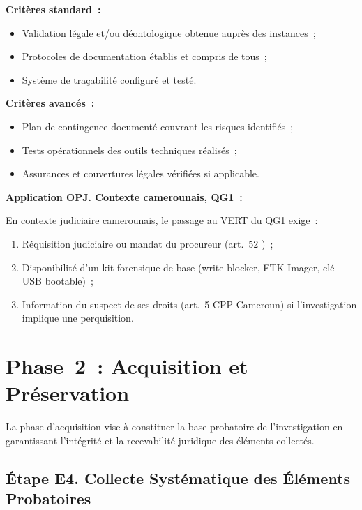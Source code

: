 \textbf{Critères standard~:}
\begin{itemize}
    \item Validation légale et/ou déontologique obtenue auprès des instances~;
    \item Protocoles de documentation établis et compris de tous~;
    \item Système de traçabilité configuré et testé.
\end{itemize}

\textbf{Critères avancés~:}
\begin{itemize}
    \item Plan de contingence documenté couvrant les risques identifiés~;
    \item Tests opérationnels des outils techniques réalisés~;
    \item Assurances et couvertures légales vérifiées si applicable.
\end{itemize}

\begin{boxPNC}
\textbf{Application OPJ. Contexte camerounais, QG1~:}

En contexte judiciaire camerounais, le passage au VERT du QG1 exige~:
\begin{enumerate}
    \item Réquisition judiciaire ou mandat du procureur (art.~52 )~;
    \item Disponibilité d'un kit forensique de base (write blocker,
          FTK Imager, clé USB bootable)~;
    \item Information du suspect de ses droits (art.~5 CPP Cameroun)
          si l'investigation implique une perquisition.
\end{enumerate}
\end{boxPNC}

\section{Phase~2~: Acquisition et Préservation}
\label{sec:piu-phase2}

La phase d'acquisition vise à constituer la base probatoire de l'investigation
en garantissant l'intégrité et la recevabilité juridique des éléments collectés.

\subsection{Étape E4. Collecte Systématique des Éléments Probatoires}

